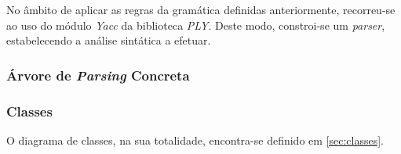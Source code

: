\documentclass[../relatorio.tex]{subfiles}
\begin{document}

No âmbito de aplicar as regras da gramática definidas anteriormente,
recorreu-se ao uso do módulo \textit{Yacc} da biblioteca \textit{PLY}. 
Deste modo, constroi-se um \textit{parser}, estabelecendo a análise 
sintática a efetuar.

\subsubsection{Árvore de \textit{Parsing} Concreta}


\subsubsection{Classes}

O diagrama de classes, na sua totalidade, encontra-se definido em \ref{sec:classes}.
\end{document}
